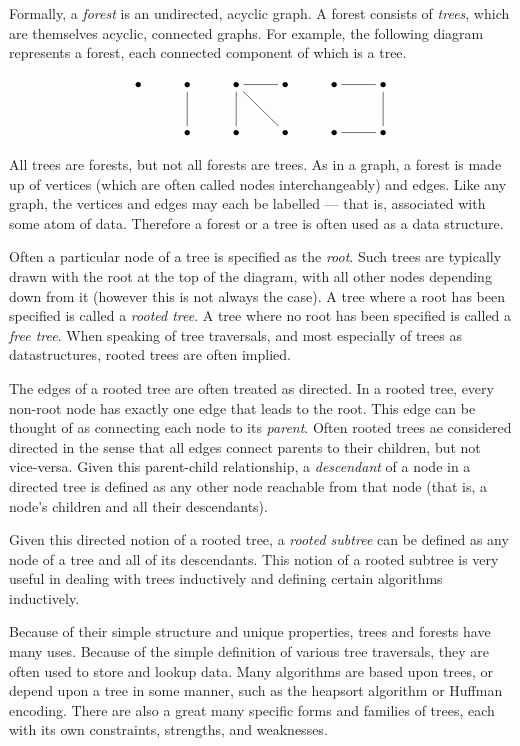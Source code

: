 \documentclass[12pt]{article}
\begin{document}
Formally, a \emph{forest} is an undirected, acyclic graph.  A forest consists of
\emph{trees}, which are themselves acyclic, connected graphs.  For example,
the following diagram represents a forest, each connected component of which is a tree.

$$
\xymatrix{
\bullet & \bullet \ar@{-}[d] & \bullet \ar@{-}[r] \ar@{-}[d] \ar@{-}[dr] & \bullet  & \bullet \ar@{-}[r] & \bullet \ar@{-}[d] \\
        & \bullet            & \bullet & \bullet & \bullet \ar@{-}[r] & \bullet
}
$$

All trees are forests, but not all forests are trees.  As in a graph, a forest is made up of vertices (which are often called nodes interchangeably) and edges.
Like any graph, the vertices and edges may each be labelled --- that is, associated with some atom of data.  Therefore a forest or a tree is often used as a data structure.

Often a particular node of a tree is specified as the \emph{root}.  Such trees are typically drawn with the root at the top of the diagram, with all other nodes depending down from it (however this is not always the case).  A tree where a root has been specified is called a \emph{rooted tree}.  A tree where no root has been specified is called a \emph{free tree}.  When speaking of tree traversals, and most especially of trees as datastructures, rooted trees are often implied.

The edges of a rooted tree are often treated as directed.  In a rooted tree, every non-root node has exactly one edge that leads to the root.  This edge can be thought of as connecting each node to its \emph{parent}.  Often rooted trees ae considered directed in the sense that all edges connect parents to their children, but not vice-versa.  Given this parent-child relationship, a \emph{descendant} of a node in a directed tree is defined as any other node reachable from that node (that is, a node's children and all their descendants).

Given this directed notion of a rooted tree, a \emph{rooted subtree} can be defined as any node of a tree and all of its descendants.  This notion of a rooted subtree is very useful in dealing with trees inductively and defining certain algorithms inductively.

Because of their simple structure and unique properties, trees and forests have many uses.  Because of the simple definition of various tree traversals, they are often used to store and lookup data.  Many algorithms are based upon trees, or depend upon a tree in some manner, such as the heapsort algorithm or Huffman encoding.
There are also a great many specific forms and families of trees, each with its own constraints, strengths, and weaknesses.
\end{document}

